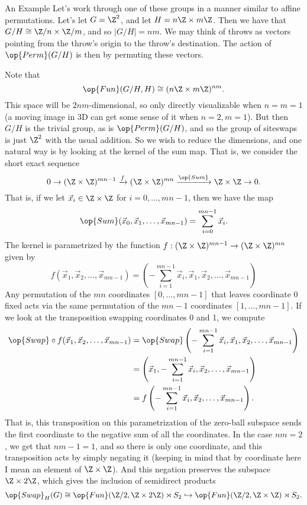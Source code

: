 \documentclass[12nt]{article}
\theoremstyle{plain}
\begin{document}
\begin{subsection}{An Example}
Let's work through one of these groups in a manner similar to affine permutations. Let's let $G = \Z^2$, and let $H = n\Z \times m\Z$. Then we have that $G/H \cong \Z/n \times \Z/m$, and so $|G/H| = nm$. We may think of throws as vectors pointing from the throw's origin to the throw's destination. The action of $\op{Perm}(G/H)$ is then by permuting these vectors. 

Note that \[
\op{Fun}(G/H, H) \cong (n\Z \times m\Z)^{nm}.
\]
This space will be $2nm$-dimensional, so only directly visualizable when $n = m = 1$ (a moving image in 3D can get some sense of it when $n = 2, m = 1$). But then $G/H$ is the trivial group, as is $\op{Perm}(G/H)$, and so the group of siteswaps is just $\Z^2$ with the usual addition. So we wish to reduce the dimensions, and one natural way is by looking at the kernel of the sum map. That is, we consider the short exact sequence
\[
0 \to (\Z \times \Z)^{mn - 1} \xrightarrow{f} (\Z \times \Z)^{mn} \xrightarrow{\op{Sum}} \Z \times \Z \to 0.
\]
That is, if we let $\vec{x}_i \in \Z \times \Z$ for $i = 0, \dots, mn - 1$, then we have the map
\[
\op{Sum}(\vec{x}_0, \vec{x}_1, \dots, \vec{x}_{mn-1}) = \sum \limits_{i=0}^{mn - 1} \vec{x}_i.
\]
The kernel is parametrized by the function $f : (\Z \times \Z)^{mn - 1} \to (\Z \times \Z)^{mn}$ given by
\[
f(\vec{x}_1, \vec{x}_2, \dots, \vec{x}_{mn - 1}) = \left(-\sum \limits_{i=1}^{mn - 1} \vec{x}_i, \vec{x}_1, \vec{x}_2, \dots, \vec{x}_{mn - 1} \right)
\]
Any permutation of the $mn$ coordinates $[0, \dots, mn - 1]$ that leaves coordinate 0 fixed acts via the same permutation of the $mn - 1$ coordinates $[1, \dots, mn - 1]$. If we look at the transposition swapping coordinates 0 and 1, we compute
\begin{align*}
\op{Swap} \circ f(\vec{x}_1, \vec{x}_2, \dots, \vec{x}_{mn - 1}) &= \op{Swap}\left(-\sum \limits_{i=1}^{mn - 1} \vec{x}_i, \vec{x}_1, \vec{x}_2, \dots, \vec{x}_{mn - 1} \right) \\
	&= \left(\vec{x}_1, -\sum \limits_{i=1}^{mn - 1} \vec{x}_i, \vec{x}_2, \dots, \vec{x}_{mn - 1} \right) \\
	&= f \left( -\sum \limits_{i=1}^{mn - 1} \vec{x}_i, \vec{x}_2, \dots, \vec{x}_{mn - 1} \right).
\end{align*}
That is, this transposition on this parametrization of the zero-ball subspace sends the first coordinate to the negative sum of all the coordinates. In the case $nm = 2$, we get that $nm - 1 = 1$, and so there is only one coordinate, and this transposition acts by simply negating it (keeping in mind that by coordinate here I mean an element of $\Z \times \Z$). And this negation preserves the subspace $\Z \times 2\Z$, which gives the inclusion of semidirect products \[\op{Swap}_H(G) \cong \op{Fun}(\Z/2, \Z \times 2\Z) \rtimes S_2 \hookrightarrow \op{Fun}(\Z/2, \Z \times \Z) \rtimes S_2.\] 

\end{subsection}
\end{document}
